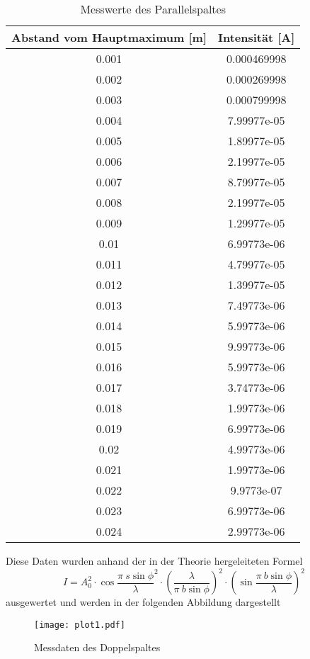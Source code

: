   \begin{table}[H]
    \centering
    \caption{Messwerte des Parallelspaltes}
    \label{tab:mag}
    \begin{tabular}{c c}
     \toprule
      Abstand vom Hauptmaximum [m] & Intensität [A]\\
     \midrule
  0.001       & 0.000469998 \\
  0.002       & 0.000269998 \\
  0.003       & 0.000799998 \\
  0.004       & 7.99977e-05 \\
  0.005       & 1.89977e-05 \\
  0.006       & 2.19977e-05 \\
  0.007       & 8.79977e-05 \\
  0.008       & 2.19977e-05 \\
  0.009       & 1.29977e-05 \\
  0.01        & 6.99773e-06 \\
  0.011       & 4.79977e-05 \\
  0.012       & 1.39977e-05 \\
  0.013       & 7.49773e-06 \\
  0.014       & 5.99773e-06 \\
  0.015       & 9.99773e-06 \\
  0.016       & 5.99773e-06 \\
  0.017       & 3.74773e-06 \\
  0.018       & 1.99773e-06 \\
  0.019       & 6.99773e-06 \\
  0.02        & 4.99773e-06 \\
  0.021       & 1.99773e-06 \\
  0.022       & 9.9773e-07  \\
  0.023       & 6.99773e-06 \\
  0.024       & 2.99773e-06 \\
  \bottomrule
  \end{tabular}
  \end{table}
  Diese Daten wurden anhand der in der Theorie hergeleiteten Formel 
  \begin{equation*}
    I= A_0^2\cdot \cos{\dfrac{\pi\ s \sin{\phi}}{\lambda}}^2 \cdot
    (\dfrac{\lambda}{\pi \ b \sin{\phi}})^2 \cdot (\sin{\dfrac{\pi\ b \sin{\phi}}{\lambda}})^2
  \end{equation*}
  ausgewertet und werden in der folgenden Abbildung dargestellt
  \begin{figure}
    \centering
    \texttt{[image: plot1.pdf]}
    \caption{Messdaten des Doppelspaltes}
    \label{fig:p}
  \end{figure}
